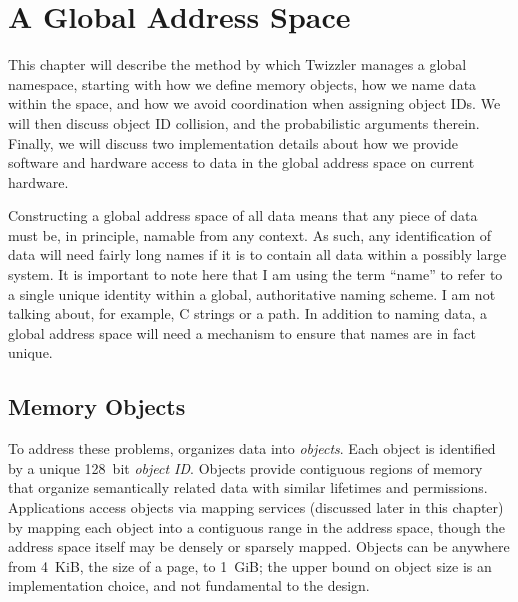 
\chapter{A Global Address Space}\label{ch:global}

\begin{chabstract}
    This chapter will describe the method by which Twizzler manages a global namespace, starting with how we define
    memory objects, how we name data within the space, and how we avoid coordination when assigning object IDs. We will
    then discuss object ID collision, and the probabilistic arguments therein. Finally, we will discuss two
    implementation details about how we provide software and hardware access to data in the global address space on
    current hardware.
\end{chabstract}

Constructing a global address space of all data means that any piece of data must be, in principle, namable from any
context. As such, any identification of data will need fairly long names if it is to contain all data within a possibly
large system. It is important to note here that I am using the term ``name'' to refer to a single unique identity
within a global, authoritative naming scheme. I am not talking about, for example, C strings or a
path. In addition to naming data, a global address space will need a mechanism to ensure that names are in fact unique.

\section{Memory Objects}
To address these problems, \Twizzler organizes data into \emph{objects}. Each object is
identified by a unique 128~bit \emph{object ID}.
Objects provide contiguous regions of memory that organize
semantically related data with similar lifetimes and permissions.
Applications access objects via
mapping services (discussed later in this chapter) by mapping each object into a contiguous range
in the address space, though the address space itself may be densely or sparsely mapped.
Objects can be anywhere from 4~KiB, the size of a page, to 1~GiB; the upper bound on object size is
an implementation choice, and not fundamental to the design.

